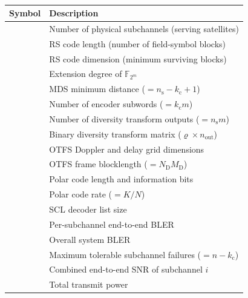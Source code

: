 \documentclass[lettersize,journal]{IEEEtran}
\providecommand{\DIFadd}[1]{{\protect\color{blue}#1}} %
\providecommand{\DIFaddFL}[1]{\DIFadd{#1}} %
\begin{document}
\begin{table}[t]
\centering
\color{blue}
\caption{{\color{blue}\DIFaddFL{Key Notation}}}
\label{tab:notation}
\begin{tabular}{@{}>{\color{blue}}c>{\color{blue}}l@{}}
\toprule
\textbf{\DIFaddFL{Symbol}} & \textbf{\DIFaddFL{Description}} \\
\midrule
\DIFaddFL{$n$ ($= N_{\text{serv}}$) }& \DIFaddFL{Number of physical subchannels (serving satellites) }\\
\DIFaddFL{$n_{\mathrm{s}}$ }& \DIFaddFL{RS code length (number of field-symbol blocks) }\\
\DIFaddFL{$k_{\mathrm{c}}$ }& \DIFaddFL{RS code dimension (minimum surviving blocks) }\\
\DIFaddFL{$m$ }& \DIFaddFL{Extension degree of $\mathbb{F}_{2^m}$ }\\
\DIFaddFL{$d_{\min}$ }& \DIFaddFL{MDS minimum distance ($= n_{\mathrm{s}} - k_{\mathrm{c}} + 1$) }\\
\DIFaddFL{$\varrho$ }& \DIFaddFL{Number of encoder subwords ($= k_{\mathrm{c}} m$) }\\
\DIFaddFL{$n_{\text{out}}$ }& \DIFaddFL{Number of diversity transform outputs ($= n_{\mathrm{s}} m$) }\\
\DIFaddFL{$G_{\mathrm{DIV}}$ }& \DIFaddFL{Binary diversity transform matrix ($\varrho \times n_{\text{out}}$) }\\
\DIFaddFL{$N_{\mathrm{D}}, M_{\mathrm{D}}$ }& \DIFaddFL{OTFS Doppler and delay grid dimensions }\\
\DIFaddFL{$n_c$ }& \DIFaddFL{OTFS frame blocklength ($= N_{\mathrm{D}} M_{\mathrm{D}}$) }\\
\DIFaddFL{$(N, K)$ }& \DIFaddFL{Polar code length and information bits }\\
\DIFaddFL{$R_c$ }& \DIFaddFL{Polar code rate ($= K/N$) }\\
\DIFaddFL{$L$ }& \DIFaddFL{SCL decoder list size }\\
\DIFaddFL{$\epsilon_i^{\mathrm{E2E}}$ }& \DIFaddFL{Per-subchannel end-to-end BLER }\\
\DIFaddFL{$\epsilon_{\mathrm{sys}}$ }& \DIFaddFL{Overall system BLER }\\
\DIFaddFL{$f_{\max}$ }& \DIFaddFL{Maximum tolerable subchannel failures ($= n - k_{\mathrm{c}}$) }\\
\DIFaddFL{$\gamma_i^{\mathrm{c}}$ }& \DIFaddFL{Combined end-to-end SNR of subchannel $i$ }\\
\DIFaddFL{$P_{\mathrm{total}}$ }& \DIFaddFL{Total transmit power }\\

\end{tabular}
\end{table}
\end{document}
